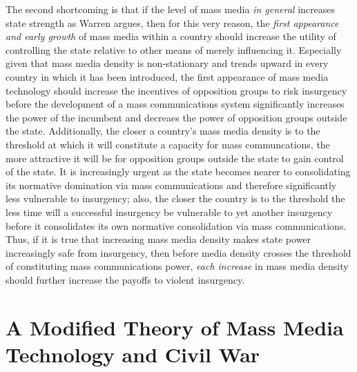 \documentclass[11pt,article,oneside]{memoir}
\begin{document}
The second shortcoming is that if the level of mass media \emph{in
general} increases state strength as Warren argues, then for this very
reason, the \emph{first appearance and early growth} of mass media
within a country should increase the utility of controlling the state
relative to other means of merely influencing it. Especially given that
mass media density is non-stationary and trends upward in every country
in which it has been introduced, the first appearance of mass media
technology should increase the incentives of opposition groups to risk
insurgency before the development of a mass communications system
significantly increases the power of the incumbent and decreaes the
power of opposition groups outside the state. Additionally, the closer a
country's mass media density is to the threshold at which it will
constitute a capacity for mass communcations, the more attractive it
will be for opposition groups outside the state to gain control of the
state. It is increasingly urgent as the state becomes nearer to
consolidating its normative domination via mass communications and
therefore significantly less vulnerable to insurgency; also, the closer
the country is to the threshold the less time will a successful
insurgency be vulnerable to yet another insurgency before it
consolidates its own normative consolidation via mass communications.
Thus, if it is true that increasing mass media density makes state power
increasingly safe from insurgency, then before media density crosses the
threshold of constituting mass communications power, \emph{each
increase} in mass media density should further increase the payoffs to
violent insurgency.

\section{A Modified Theory of Mass Media Technology and Civil
War}\label{a-modified-theory-of-mass-media-technology-and-civil-war}
\end{document}
